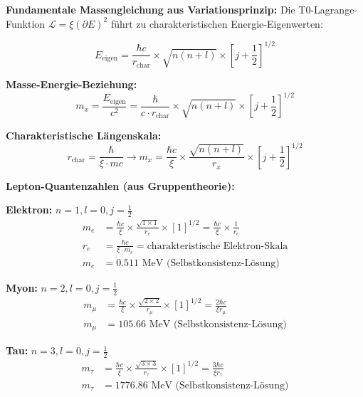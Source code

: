 \documentclass[12pt,a4paper]{article}
\numberwithin{equation}{section}
\newcommand{\xipar}{\xi}
\newcommand{\calL}{\mathcal{L}}
\begin{document}
	\textbf{Fundamentale Massengleichung aus Variationsprinzip:}
	Die T0-Lagrange-Funktion $\calL = \xipar(\partial E)^2$ führt zu charakteristischen Energie-Eigenwerten:
	
	\begin{equation}
		E_{\text{eigen}} = \frac{\hbar c}{r_{\text{char}}} \times \sqrt{n(n+l)} \times [j+\frac{1}{2}]^{1/2}
		\label{eq:energy_eigenvalues}
	\end{equation}
	
	\textbf{Masse-Energie-Beziehung:}
	\begin{equation}
		m_x = \frac{E_{\text{eigen}}}{c^2} = \frac{\hbar}{c \cdot r_{\text{char}}} \times \sqrt{n(n+l)} \times [j+\frac{1}{2}]^{1/2}
		\label{eq:mass_energy}
	\end{equation}
	
	\textbf{Charakteristische Längenskala:}
	\begin{equation}
		r_{\text{char}} = \frac{\hbar}{\xipar \cdot mc} \rightarrow m_x = \frac{\hbar c}{\xipar} \times \frac{\sqrt{n(n+l)}}{r_x} \times [j+\frac{1}{2}]^{1/2}
		\label{eq:characteristic_length}
	\end{equation}
	
	\textbf{Lepton-Quantenzahlen (aus Gruppentheorie):}
	
	\textbf{Elektron:} $n=1, l=0, j=\frac{1}{2}$
	\begin{align}
		m_e &= \frac{\hbar c}{\xipar} \times \frac{\sqrt{1 \times 1}}{r_e} \times [1]^{1/2} = \frac{\hbar c}{\xipar} \times \frac{1}{r_e}\\
		r_e &= \frac{\hbar c}{\xipar \cdot m_e} = \text{charakteristische Elektron-Skala}\\
		m_e &= 0.511 \text{ MeV (Selbstkonsistenz-Lösung)}
		\label{eq:electron_mass}
	\end{align}
	
	\textbf{Myon:} $n=2, l=0, j=\frac{1}{2}$
	\begin{align}
		m_\mu &= \frac{\hbar c}{\xipar} \times \frac{\sqrt{2 \times 2}}{r_\mu} \times [1]^{1/2} = \frac{2\hbar c}{\xipar r_\mu}\\
		m_\mu &= 105.66 \text{ MeV (Selbstkonsistenz-Lösung)}
		\label{eq:muon_mass}
	\end{align}
	
	\textbf{Tau:} $n=3, l=0, j=\frac{1}{2}$
	\begin{align}
		m_\tau &= \frac{\hbar c}{\xipar} \times \frac{\sqrt{3 \times 3}}{r_\tau} \times [1]^{1/2} = \frac{3\hbar c}{\xipar r_\tau}\\
		m_\tau &= 1776.86 \text{ MeV (Selbstkonsistenz-Lösung)}
		\label{eq:tau_mass}
	\end{align}
	
\end{document}
